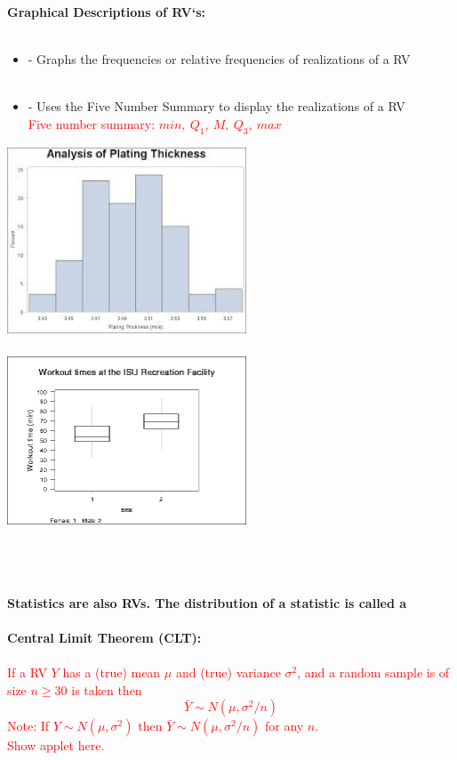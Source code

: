 \large \textbf{Graphical Descriptions of RV`s:}\normalsize\\~\\
\begin{itemize}
\item \textcolor{red}{} - Graphs the frequencies or relative frequencies of realizations of a RV\\~\\
\item \textcolor{red}{} - Uses the Five Number Summary to display the realizations of a RV\\
\textcolor{red}{Five number summary: $min,~Q_1,~M,~Q_3,~max$}
\end{itemize}

\begin{center}
\includegraphics[width=2.8in, height=2.2in]{histogram}~~~~~~~~~~~\includegraphics[width=2.8in, height=2.4in]{boxplot}
\end{center}

~\\~\\
\large \textbf{Statistics are also RVs.  The distribution of a statistic is called a} \textcolor{red}{}\normalsize\\~\\
\textbf{Central Limit Theorem (CLT):}\\~\\
\textcolor{red}{If a RV $Y$ has a (true) mean $\mu$ and (true) variance $\sigma^2$, and a random sample is of size $n\geq 30$ is taken then
$$\bar{Y}\sim N(\mu,\sigma^2/n)$$
Note: If $Y\sim N(\mu,\sigma^2)$ then $\bar{Y}\sim N(\mu,\sigma^2/n)$ for any $n$.\\
Show applet here.}\\~\\

